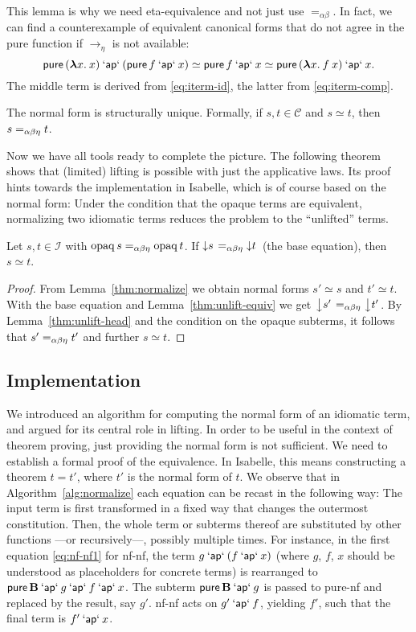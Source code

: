 This lemma is why we need eta-equivalence and not just use $=_{\alpha\beta}$.
In fact, we can find a counterexample of equivalent canonical forms that do
not agree in the pure function if $\to_\eta$ is not available:
\[ \operatorname{\mathsf{pure}}{({\boldsymbol\lambda} x.\>x)} \mathbin{\mathsf{`ap`}} (\operatorname{\mathsf{pure}} f \mathbin{\mathsf{`ap`}} x) \simeq
	\operatorname{\mathsf{pure}} f \mathbin{\mathsf{`ap`}} x \simeq \operatorname{\mathsf{pure}}{({\boldsymbol\lambda} x.\>f \> x)} \mathbin{\mathsf{`ap`}} x. \]
The middle term is derived from \eqref{eq:iterm-id}, the latter from
\eqref{eq:iterm-comp}.

\begin{corollary}\label{thm:nf-unique}
The normal form is structurally unique.
Formally, if $s,t \in \mathcal{C}$ and $s \simeq t$, then $s =_{\alpha\beta\eta} t$.
\end{corollary}

Now we have all tools ready to complete the picture.
The following theorem shows that (limited) lifting is possible with just
the applicative laws.
Its proof hints towards the implementation in Isabelle, which is of course
based on the normal form:
Under the condition that the opaque terms are equivalent, normalizing two
idiomatic terms reduces the problem to the ``unlifted'' terms.

\begin{theorem}\label{thm:nf-lifting}
Let $s,t \in \mathcal{I}$ with $\operatorname{opaq} s =_{\alpha\beta\eta} \operatorname{opaq} t$.
If $\left\downarrow s\right. =_{\alpha\beta\eta} \left\downarrow t\right.$ (the base equation), then $s \simeq t$.
\end{theorem}
\begin{proof}
From Lemma~\ref{thm:normalize} we obtain normal forms $s' \simeq s$ and
$t' \simeq t$.
With the base equation and Lemma~\ref{thm:unlift-equiv} we get
$\left\downarrow s'\right. =_{\alpha\beta\eta} \left\downarrow t'\right.$.
By Lemma~\ref{thm:unlift-head} and the condition on the opaque subterms, it
follows that $s' =_{\alpha\beta\eta} t'$ and further $s \simeq t$.
\end{proof}

\subsection{Implementation}\label{subsec:nf-implementation}

We introduced an algorithm for computing the normal form of an idiomatic term,
and argued for its central role in lifting.
In order to be useful in the context of theorem proving, just providing the
normal form is not sufficient.
We need to establish a formal proof of the equivalence.
In Isabelle, this means constructing a theorem $t = t'$, where $t'$ is the
normal form of $t$.
We observe that in Algorithm~\ref{alg:normalize} each equation can be recast
in the following way:
The input term is first transformed in a fixed way that changes the outermost
constitution.
Then, the whole term or subterms thereof are substituted by other functions%
---or recursively---, possibly multiple times.
For instance, in the first equation \eqref{eq:nf-nf1} for nf-nf, the term
$g \mathbin{\mathsf{`ap`}} (f \mathbin{\mathsf{`ap`}} x)$ (where $g$, $f$, $x$ should be understood as placeholders
for concrete terms) is rearranged to $\operatorname{\mathsf{pure}} \mathbf{B} \mathbin{\mathsf{`ap`}} g \mathbin{\mathsf{`ap`}} f \mathbin{\mathsf{`ap`}} x$.
The subterm $\operatorname{\mathsf{pure}} \mathbf{B} \mathbin{\mathsf{`ap`}} g$ is passed to pure-nf and replaced by
the result, say $g'$.
nf-nf acts on $g' \mathbin{\mathsf{`ap`}} f$, yielding $f'$, such that the final term is
$f' \mathbin{\mathsf{`ap`}} x$.

